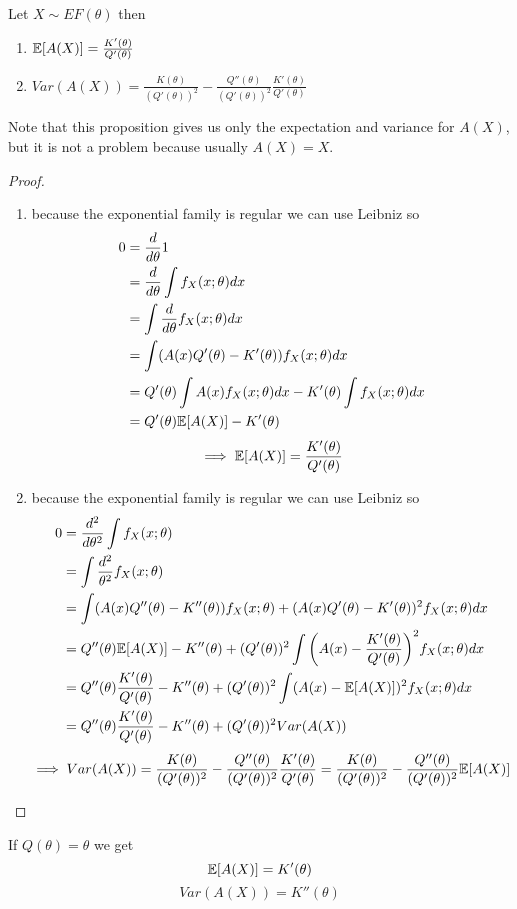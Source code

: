 \begin{prop}
	Let $X\sim EF(\theta)$ then
	\begin{enumerate}
		\item $\mathbb{E}[A(X)]=\frac{K'(\theta)}{Q'(\theta)}$
		\item $Var(A(X))=\frac{K(\theta)}{(Q'(\theta))^2}-\frac{Q''(\theta)}{(Q'(\theta))^2}\frac{K'(\theta)}{Q'(\theta)}$
	\end{enumerate}
\end{prop}
Note that this proposition gives us only the expectation and variance for $A(X)$, but it is not a problem because usually $A(X)=X$.
\begin{proof}
	\begin{enumerate}
		\item because the exponential family is regular we can use Leibniz so \[
		\begin{split}
		0
		&=\frac{d}{d\theta} 1\\
		&=\frac{d}{d\theta}\int f_X(x;\theta)dx\\
		&=\int \frac{d}{d\theta} f_X(x;\theta)dx\\
		&=\int (A(x)Q'(\theta)-K'(\theta))f_X(x;\theta)dx\\
		&=Q'(\theta)\int A(x) f_X(x;\theta)dx-K'(\theta)\int f_X(x;\theta)dx\\
		&=Q'(\theta)\mathbb{E}[A(X)]-K'(\theta)
		\end{split}
		\]
		\[\implies \mathbb{E}[A(X)]=\frac{K'(\theta)}{Q'(\theta)}\]
		\item because the exponential family is regular we can use Leibniz so
		\[
		\begin{split}
		0
		&=\frac{d^2}{d\theta^2}\int f_X(x;\theta)\\
		&=\int \frac{d^2}{\theta^2} f_X(x;\theta)\\
		&=\int (A(x)Q''(\theta)-K''(\theta))f_X(x;\theta)+(A(x)Q'(\theta)-K'(\theta))^2f_X(x;\theta)dx\\
		&=Q''(\theta)\mathbb{E}[A(X)]-K''(\theta)+(Q'(\theta))^2\int \bigg( A(x)-\frac{K'(\theta)}{Q'(\theta)} \bigg)^2 f_X(x;\theta)dx\\
		&=Q''(\theta)\frac{K'(\theta)}{Q'(\theta)}-K''(\theta)+(Q'(\theta))^2\int ( A(x)-\mathbb{E}[A(X)] )^2 f_X(x;\theta)dx\\
		&=Q''(\theta)\frac{K'(\theta)}{Q'(\theta)}-K''(\theta)+(Q'(\theta))^2Var(A(X))\\
		\end{split}
		\]
		\[
		\implies Var(A(X))=\frac{K(\theta)}{(Q'(\theta))^2}-\frac{Q''(\theta)}{(Q'(\theta))^2}\frac{K'(\theta)}{Q'(\theta)}=\frac{K(\theta)}{(Q'(\theta))^2}-\frac{Q''(\theta)}{(Q'(\theta))^2}\mathbb{E}[A(X)]
		\]
	\end{enumerate}
\end{proof}
\begin{oss}
	If $Q(\theta)=\theta$ we get$$\mathbb{E}[A(X)]=K'(\theta)$$
	$$Var(A(X))=K''(\theta)$$
\end{oss}
